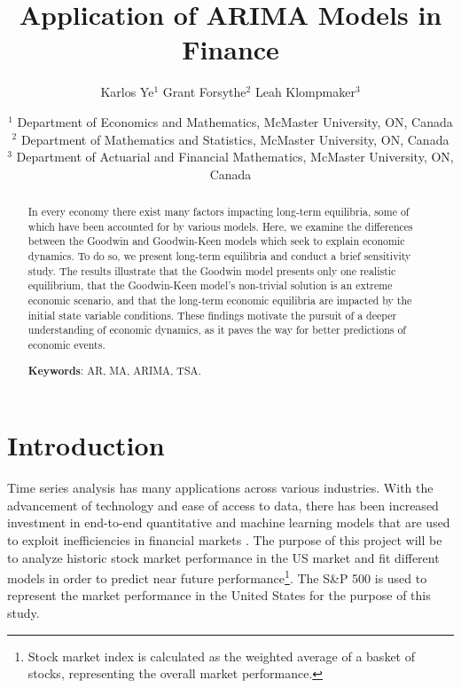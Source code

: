 \documentclass[12pt, centerh1]{article}
\title{Application of ARIMA Models in Finance} %
\author{\qquad Karlos Ye$^{1}$ \qquad Grant Forsythe$^{2}$ \qquad Leah Klompmaker$^{3}$}
\date{
{\footnotesize $^1$ Department of Economics and Mathematics, McMaster University, ON, Canada\\[-6pt]
               $^2$ Department of Mathematics and Statistics, McMaster University, ON, Canada\\[-6pt]
               $^3$ Department of Actuarial and Financial Mathematics, McMaster University, ON, Canada\\[-6pt]}
}
\begin{document}
\maketitle
\vspace{-8mm} %
\begin{abstract}
In every economy there exist many factors impacting long-term equilibria, some of which have been accounted for by various models. 
Here, we examine the differences between the Goodwin and Goodwin-Keen models which seek to explain economic dynamics. To do so, we present long-term equilibria and conduct a brief sensitivity study. The results illustrate that the Goodwin model presents only one realistic equilibrium, that the Goodwin-Keen model's non-trivial solution is an extreme economic scenario, and that the long-term economic equilibria are impacted by the initial state variable conditions. These findings motivate the pursuit of a deeper understanding of economic dynamics, as it paves the way for better predictions of economic events.

\noindent\textbf{Keywords}: AR, MA, ARIMA, TSA.


\end{abstract}
\newpage

\section{Introduction}
Time series analysis has many applications across various industries. With the advancement of technology and ease of access to data, there has been increased investment in end-to-end quantitative and machine learning models that are used to exploit inefficiencies in financial markets \citep{coqueret2021machine}. The purpose of this project will be to analyze historic stock market performance in the US market and fit different models in order to predict near future performance\footnote{Stock market index is calculated as the weighted average of a basket of stocks, representing the overall market performance.}. The S\&P 500 is used to represent the market performance in the United States for the purpose of this study. 
\end{document}
